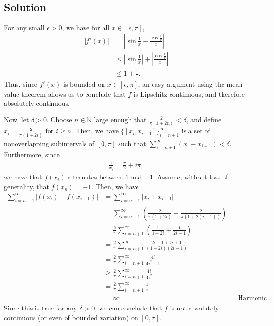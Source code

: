 \documentclass[10pt,a4paper]{article}
\theoremstyle{theorem}
\theoremstyle{definition}
\begin{document}
\subsection*{Solution}
For any small $\epsilon > 0$, we have for all $x \in [\epsilon, \pi]$,
\begin{align*}
|f'(x)| &= \left| \sin \frac{1}{x} - \frac{\cos\frac{1}{x}}{x} \right|\\
&\leq \left| \sin \frac{1}{x} \right| + \left| \frac{\cos\frac{1}{x}}{x} \right|\\
&\leq 1 + \frac{1}{\epsilon}.
\end{align*}
Thus, since $f'(x)$ is bounded on $x \in [\epsilon, \pi]$, an easy argument using the mean value theorem allows us to conclude that $f$ is Lipschitz continuous, and therefore absolutely continuous.

Now, let $\delta > 0$. Choose $n \in \mathbb{N}$ large enough that $\frac{2}{\pi (1 + 2n)} < \delta$, and define $x_i = \frac{2}{\pi (1 + 2i)}$ for $i \geq n$. Then, we have $\{[x_i, x_{i-1}] \}_{i=n + 1}^\infty$ is a set of nonoverlapping subintervals of $[0, \pi]$ such that $\sum_{i= n + 1}^\infty (x_i - x_{i-1}) < \delta$. Furthermore, since 
\begin{align*}
\frac{1}{x_i} = \frac{\pi}{2} + i \pi,
\end{align*}
we have that $f(x_i)$ alternates between $1$ and $-1$. Assume, without loss of generality, that $f(x_n) = -1$. Then, we have
\begin{align*}
\sum_{i=n + 1}^\infty |f(x_i) - f(x_{i-1})| &= \sum_{i=n + 1}^\infty |x_i + x_{i-1}|\\
&= \sum_{i=n + 1}^\infty \left(\frac{2}{\pi (1 + 2i)} + \frac{2}{\pi (1 + 2(i-1))} \right)\\
&= \frac{2}{\pi} \sum_{i=n + 1}^\infty \left(\frac{1}{1 + 2i} + \frac{1}{2i - 1} \right)\\
&= \frac{2}{\pi} \sum_{i=n + 1}^\infty \frac{2i - 1 + 2i + 1}{(1 + 2i)(2i - 1)} \\
&= \frac{2}{\pi} \sum_{i=n + 1}^\infty \frac{4i}{4i^2 - 1} \\
&\geq \frac{2}{\pi} \sum_{i=n + 1}^\infty \frac{4i}{4i^2} \\
&= \frac{2}{\pi} \sum_{i=n + 1}^\infty \frac{1}{i}\\
&= \infty && \text{Harmonic series does not converge}.
\end{align*}
Since this is true for any $\delta > 0$, we can conclude that $f$ is not absolutely continuous (or even of bounded variation) on $[0, \pi]$.
\end{document}

